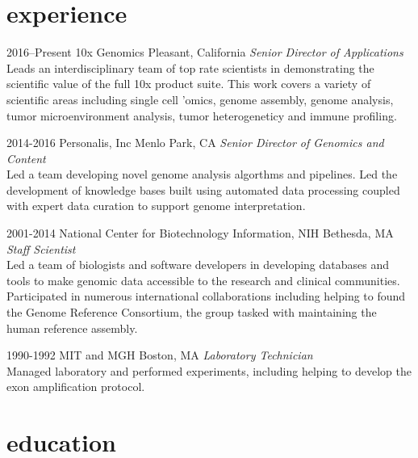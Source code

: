 \documentclass[]{dmc-cv} %
\begin{document}
\section{experience}

\begin{entrylist}


\entry
{2016--Present}
{10x Genomics}
{Pleasant, California}
{\emph{Senior Director of Applications} \\
Leads an interdisciplinary team of top rate scientists in demonstrating the scientific value of the full
10x product suite. This work covers a variety of scientific areas including single cell 'omics, genome assembly, genome analysis,
tumor microenvironment analysis, tumor heterogeneticy and immune profiling.
}

\entry
{2014-2016}
{Personalis, Inc}
{Menlo Park, CA}
{\emph{Senior Director of Genomics and Content} \\
Led a team developing novel genome analysis algorthms and pipelines. Led the development of knowledge bases built using automated data processing coupled with expert data curation to support genome interpretation.
}

\entry
{2001-2014}
{National Center for Biotechnology Information, NIH}
{Bethesda, MA}
{\emph{Staff Scientist} \\
Led a team of biologists and software developers in developing databases and tools to make genomic data accessible to the research and clinical communities. Participated in numerous international collaborations including helping to found the Genome Reference Consortium, the group tasked with maintaining the human reference assembly.
}

\entry
{1990-1992}
{MIT and MGH}
{Boston, MA}
{\emph{Laboratory Technician}\\
Managed laboratory and performed experiments, including helping to develop the exon amplification protocol.
}

\end{entrylist}


\section{education}
\end{document}
